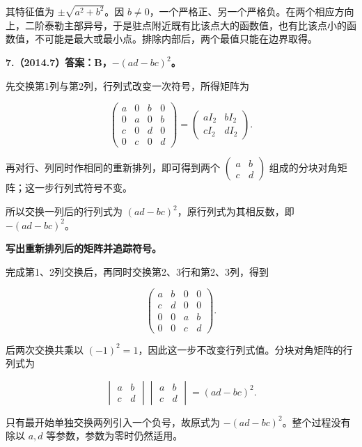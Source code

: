 \documentclass[UTF8,11pt,fontset=windows]{ctexart}
\begin{document}
其特征值为 $\pm\sqrt{a^2+b^2}$。因 $b\ne0$，一个严格正、另一个严格负。在两个相应方向上，二阶泰勒主部异号，于是驻点附近既有比该点大的函数值，也有比该点小的函数值，不可能是最大或最小点。排除内部后，两个最值只能在边界取得。

\clearpage

\textbf{7.（2014.7）答案：B，$-(ad-bc)^2$。}

先交换第1列与第2列，行列式改变一次符号，所得矩阵为

$$
\begin{pmatrix}
a&0&b&0\\0&a&0&b\\c&0&d&0\\0&c&0&d
\end{pmatrix}
=\begin{pmatrix}aI_2&bI_2\\cI_2&dI_2\end{pmatrix}.
$$

再对行、列同时作相同的重新排列，即可得到两个 $\begin{pmatrix}a&b\\c&d\end{pmatrix}$ 组成的分块对角矩阵；这一步行列式符号不变。

所以交换一列后的行列式为 $(ad-bc)^2$，原行列式为其相反数，即 $-(ad-bc)^2$。

\textbf{写出重新排列后的矩阵并追踪符号。}

完成第1、2列交换后，再同时交换第2、3行和第2、3列，得到

$$
\begin{pmatrix}
a&b&0&0\\
c&d&0&0\\
0&0&a&b\\
0&0&c&d
\end{pmatrix}.
$$

后两次交换共乘以 $(-1)^2=1$，因此这一步不改变行列式值。分块对角矩阵的行列式为

$$
\begin{vmatrix}a&b\\c&d\end{vmatrix}
\begin{vmatrix}a&b\\c&d\end{vmatrix}=(ad-bc)^2.
$$

只有最开始单独交换两列引入一个负号，故原式为 $-(ad-bc)^2$。整个过程没有除以 $a,d$ 等参数，参数为零时仍然适用。

\clearpage
\end{document}
